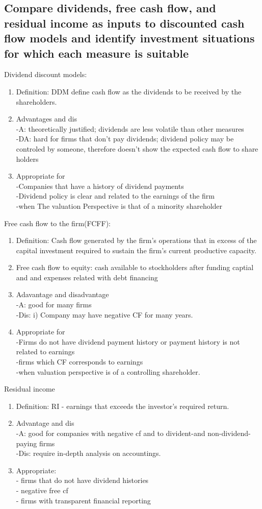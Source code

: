 \documentclass{article}
\newcommand{\be}{\begin{enumerate}}
\newcommand{\ee}{\end{enumerate}}
\begin{document}
\subsection{Compare dividends, free cash flow, and residual income as inputs
to discounted cash flow models and identify investment situations for which
each measure is suitable}
Dividend discount models:
\be
    \item Definition: DDM define cash flow as the dividends to be received by the
        shareholders.
    \item Advantages and dis
        \\-A: theoretically justified; dividends are less volatile than other measures
        \\-DA: hard for firms that don't pay dividends; dividend policy may be controled by someone,
        therefore doesn't show the expected cash flow to share holders
    \item Appropriate for
        \\-Companies that have a history of dividend payments
        \\-Dividend policy is clear and related to the earnings of the firm
        \\-when The valuation Perspective is that of a minority shareholder
\ee
Free cash flow to the firm(FCFF):
\be
    \item Definition: Cash flow generated by the firm's operations that in excess
        of the capital investment required to sustain the firm's current productive
        capacity. 
    \item Free cash flow to equity: cash available to stockholders after funding captial and
    and expenses related with debt financing
    \item Adavantage and disadvantage
        \\-A: good for many firms
        \\-Dis: i) Company may have negative CF for many years.
    \item Appropriate for
        \\-Firms do not have dividend payment history or payment history is not related
        to earnings
        \\-firms which CF corresponds to earnings
        \\-when valuation perspective is of a controlling shareholder.
\ee
Residual income
\be
    \item Definition: RI - earnings that exceeds the investor's required return. 
    \item Advantage and dis
        \\-A: good for companies with negative cf and to divident-and non-dividend-paying
        firms
        \\-Dis: require in-depth analysis on accountings. 
    \item Appropriate:
        \\- firms that do not have dividend histories
        \\- negative free cf
        \\- firms with transparent financial reporting
\ee
\end{document}
